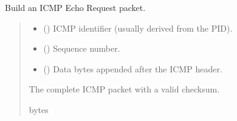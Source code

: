 \documentclass[a4paper,11pt,english,openany,oneside]{sphinxmanual}
\begin{document}

\begin{fulllineitems}
\label{\detokenize{utils:utils.build_echo_request}}
\pysigstartsignatures
{}
\pysigstopsignatures
\sphinxAtStartPar
Build an ICMP Echo Request packet.
\begin{quote}\begin{description}
\begin{itemize}
\item {} 
\sphinxAtStartPar
{} () \textendash{} ICMP identifier (usually derived from the PID).

\item {} 
\sphinxAtStartPar
{} () \textendash{} Sequence number.

\item {} 
\sphinxAtStartPar
{} () \textendash{} Data bytes appended after the ICMP header.

\end{itemize}

\sphinxAtStartPar
The complete ICMP packet with a valid checksum.

\sphinxAtStartPar
bytes

\end{description}\end{quote}

\sphinxAtStartPar
{}

\begin{sphinxVerbatim}[commandchars=\\\{\}]
  


\end{sphinxVerbatim}
\end{fulllineitems}
\end{document}
